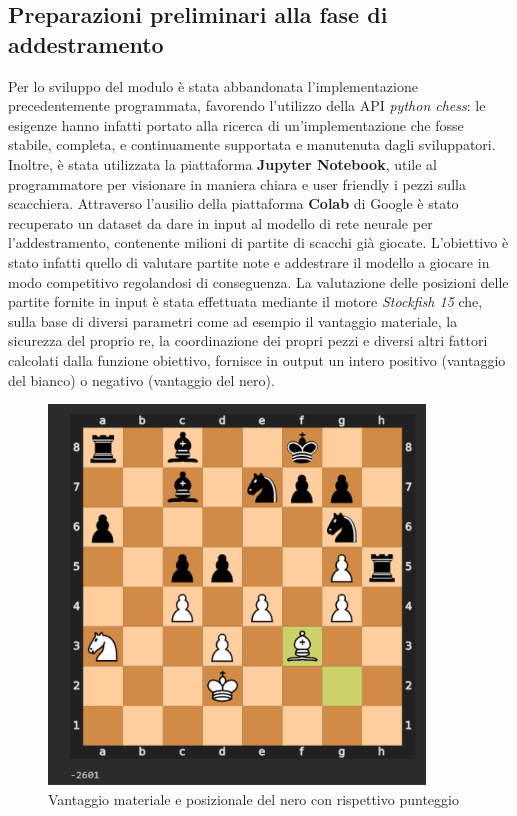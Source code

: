 \subsection{Preparazioni preliminari alla fase di addestramento}
\label{cap: preliminari}
Per lo sviluppo del modulo è stata abbandonata l'implementazione precedentemente programmata, favorendo l'utilizzo della API \textit{python chess}: le esigenze hanno infatti portato alla ricerca di un'implementazione che fosse stabile, completa, e continuamente supportata e manutenuta dagli sviluppatori. Inoltre, è stata utilizzata la piattaforma \textbf{Jupyter Notebook}, utile al programmatore per visionare in maniera chiara e user friendly i pezzi sulla scacchiera. Attraverso l'ausilio della piattaforma \textbf{Colab} di Google è stato recuperato un dataset da dare in input al modello di rete neurale per l'addestramento, contenente milioni di partite di scacchi già giocate. L'obiettivo è stato infatti quello di valutare partite note e addestrare il modello a giocare in modo competitivo regolandosi di conseguenza. La valutazione delle posizioni delle partite fornite in input è stata effettuata mediante il motore \textit{Stockfish 15} che, sulla base di diversi parametri come ad esempio il vantaggio materiale, la sicurezza del proprio re, la coordinazione dei propri pezzi e diversi altri fattori calcolati dalla funzione obiettivo, fornisce in output un intero positivo (vantaggio del bianco) o negativo (vantaggio del nero).

\begin{figure}[!htb]
    \includegraphics[width=10cm]{frontmatter/figure/valutazione_scacchiera.pdf}
    \centering
    \caption{Vantaggio materiale e posizionale del nero con rispettivo punteggio}
    \label{fig:valutazione_scacchiera}
\end{figure}


